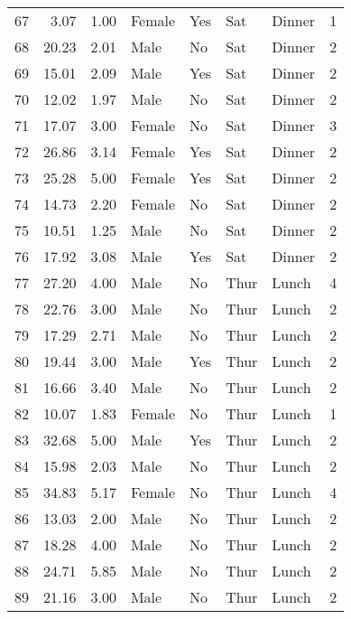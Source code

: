 \begin{tabular}{lrrllllr}
67  &        3.07 &   1.00 &  Female &    Yes &   Sat &  Dinner &     1 \\
68  &       20.23 &   2.01 &    Male &     No &   Sat &  Dinner &     2 \\
69  &       15.01 &   2.09 &    Male &    Yes &   Sat &  Dinner &     2 \\
70  &       12.02 &   1.97 &    Male &     No &   Sat &  Dinner &     2 \\
71  &       17.07 &   3.00 &  Female &     No &   Sat &  Dinner &     3 \\
72  &       26.86 &   3.14 &  Female &    Yes &   Sat &  Dinner &     2 \\
73  &       25.28 &   5.00 &  Female &    Yes &   Sat &  Dinner &     2 \\
74  &       14.73 &   2.20 &  Female &     No &   Sat &  Dinner &     2 \\
75  &       10.51 &   1.25 &    Male &     No &   Sat &  Dinner &     2 \\
76  &       17.92 &   3.08 &    Male &    Yes &   Sat &  Dinner &     2 \\
77  &       27.20 &   4.00 &    Male &     No &  Thur &   Lunch &     4 \\
78  &       22.76 &   3.00 &    Male &     No &  Thur &   Lunch &     2 \\
79  &       17.29 &   2.71 &    Male &     No &  Thur &   Lunch &     2 \\
80  &       19.44 &   3.00 &    Male &    Yes &  Thur &   Lunch &     2 \\
81  &       16.66 &   3.40 &    Male &     No &  Thur &   Lunch &     2 \\
82  &       10.07 &   1.83 &  Female &     No &  Thur &   Lunch &     1 \\
83  &       32.68 &   5.00 &    Male &    Yes &  Thur &   Lunch &     2 \\
84  &       15.98 &   2.03 &    Male &     No &  Thur &   Lunch &     2 \\
85  &       34.83 &   5.17 &  Female &     No &  Thur &   Lunch &     4 \\
86  &       13.03 &   2.00 &    Male &     No &  Thur &   Lunch &     2 \\
87  &       18.28 &   4.00 &    Male &     No &  Thur &   Lunch &     2 \\
88  &       24.71 &   5.85 &    Male &     No &  Thur &   Lunch &     2 \\
89  &       21.16 &   3.00 &    Male &     No &  Thur &   Lunch &     2 \\

\end{tabular}
